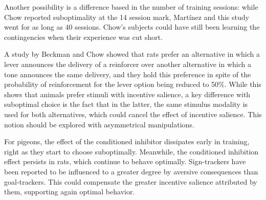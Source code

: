 \documentclass[a4paper,12pt]{article}
\begin{document}
Another possibility is a difference based in the number of training sessions: while Chow reported suboptimality at the 14 session mark, Martínez and this study went for as long as 40 sessions. Chow's subjects could have still been learning the contingencies when their experience was cut short.

A study by Beckman and Chow showed that rats prefer an alternative in which a lever announces the delivery of a reinforcer over another alternative in which a tone announces the same delivery, and they hold this preference in spite of the probability of reinforcement for the lever option being reduced to 50\%. While this shows that animals prefer stimuli with incentive salience, a key difference with suboptimal choice is the fact that in the latter, the same stimulus modality is used for both alternatives, which could cancel the effect of incentive salience. This notion should be explored with asymmetrical manipulations.

For pigeons, the effect of the conditioned inhibitor dissipates early in training, right as they start to choose suboptimally. Meanwhile, the conditioned inhibition effect persists in rats, which continue to behave optimally. Sign-trackers have been reported to be influenced to a greater degree by aversive consequences than goal-trackers. This could compensate the greater incentive salience attributed by them, supporting again optimal behavior.
\end{document}
